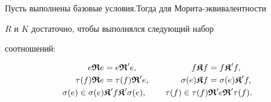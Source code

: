 \begin{cor}


Пусть выполнены базовые условия.Тогда для Морита-эквивалентности


$R$ и $K$ достаточно, чтобы выполнялся следующий набор


соотношений:


\begin{alignat*}{2}


 e \R e &= e \R' e, &\quad f \K f &= f \K' f, \\


 \t(f) \R e &= \t(f) \R' e, &\quad \s(e) \K f &=\s(e) \K' f, \\


 \s(e) \in \s(e)& \K' f \K' \s(e), &\quad \t(f) \in \t(f)& \R' e \R' \t(f).


\end{alignat*}


\end{cor}





